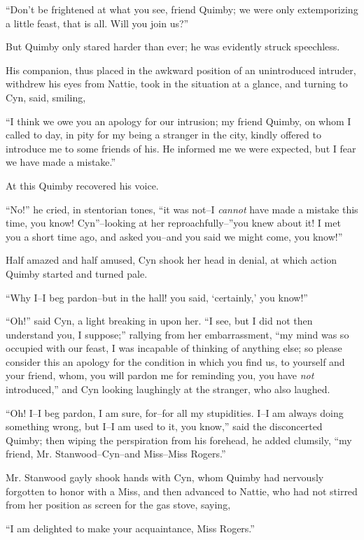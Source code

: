 ``Don't be frightened at what you see, friend Quimby; we were only
extemporizing a little feast, that is all. Will you join us?''

But Quimby only stared harder than ever; he was evidently struck
speechless.

His companion, thus placed in the awkward position of an unintroduced
intruder, withdrew his eyes from Nattie, took in the situation at a
glance, and turning to Cyn, said, smiling,

``I think we owe you an apology for our intrusion; my friend Quimby, on
whom I called to day, in pity for my being a stranger in the city,
kindly offered to introduce me to some friends of his. He informed me we
were expected, but I fear we have made a mistake.''

At this Quimby recovered his voice.

``No!'' he cried, in stentorian tones, ``it was not--I \emph{cannot} have made a
mistake this time, you know! Cyn''--looking at her reproachfully--''you
knew about it! I met you a short time ago, and asked you--and you said
we might come, you know!''

Half amazed and half amused, Cyn shook her head in denial, at which
action Quimby started and turned pale.

``Why I--I beg pardon--but in the hall! you said, `certainly,' you know!''

``Oh!'' said Cyn, a light breaking in upon her. ``I see, but I did not then
understand you, I suppose;'' rallying from her embarrassment, ``my mind
was so occupied with our feast, I was incapable of thinking of anything
else; so please consider this an apology for the condition in which you
find us, to yourself and your friend, whom, you will pardon me for
reminding you, you have \emph{not} introduced,'' and Cyn looking laughingly at
the stranger, who also laughed.

``Oh! I--I beg pardon, I am sure, for--for all my stupidities. I--I am
always doing something wrong, but I--I am used to it, you know,'' said
the disconcerted Quimby; then wiping the perspiration from his forehead,
he added clumsily, ``my friend, Mr. Stanwood--Cyn--and Miss--Miss
Rogers.''

Mr. Stanwood gayly shook hands with Cyn, whom Quimby had nervously
forgotten to honor with a Miss, and then advanced to Nattie, who had not
stirred from her position as screen for the gas stove, saying,

``I am delighted to make your acquaintance, Miss Rogers.''

